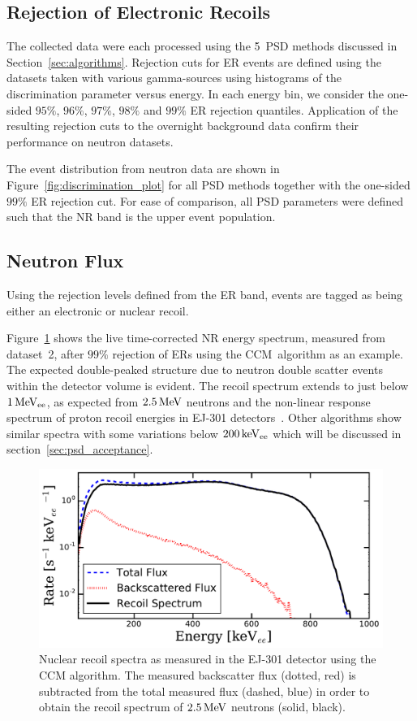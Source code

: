 \subsection{Rejection of Electronic Recoils}
The collected data were each processed using the 5~PSD methods discussed in Section~\ref{sec:algorithms}. Rejection cuts for ER events are defined using the datasets taken with various gamma-sources using histograms of the discrimination parameter versus energy. In each energy bin, we consider the one-sided $95\%$, $96\%$, $97\%$, $98\%$ and $99\%$ ER rejection quantiles. Application of the resulting rejection cuts to the overnight background data confirm their performance on neutron datasets.

The event distribution from neutron data are shown in Figure~\ref{fig:discrimination_plot} for all PSD methods together with the one-sided $99\%$ ER rejection cut. For ease of comparison, all PSD parameters were defined such that the NR band is the upper event population.

\subsection{Neutron Flux}

Using the rejection levels defined from the ER band, events are tagged as being either an electronic or nuclear recoil.

Figure~\ref{fig:psd_rateplot} shows the live time-corrected NR energy spectrum, measured from dataset~2, after $99\%$ rejection of ERs using the CCM~algorithm as an example. The expected double-peaked structure due to neutron double scatter events within the detector volume is evident.
The recoil spectrum extends to just below $1\,\mathrm{MeV_{ee}}$, as expected from $2.5\,\mathrm{MeV}$ neutrons and the non-linear response spectrum of proton recoil energies in EJ-301 detectors~\cite{Verbinski:1968,Aksoy:1994,Naqvi:1993}. Other algorithms show similar spectra with some variations below $200\,\mathrm{keV_{ee}}$ which will be discussed in section~\ref{sec:psd_acceptance}.


\begin{figure}[htbp]
\centering
    \includegraphics[width=\textwidth]{figures/psd/fig_rate_hists}
    \caption{Nuclear recoil spectra as measured in the EJ-301 detector using the CCM algorithm. The measured backscatter flux (dotted, red) is subtracted from the total measured flux (dashed, blue) in order to obtain the recoil spectrum of $2.5\,\mathrm{MeV}$ neutrons (solid, black).}\label{fig:psd_rateplot}
\end{figure}

